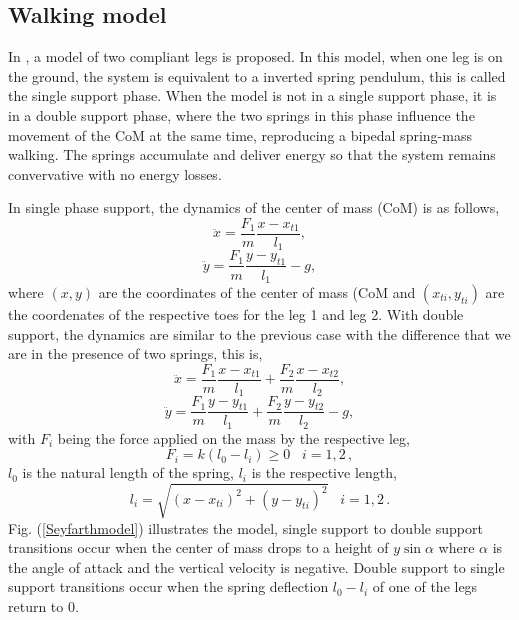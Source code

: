 \subsection{Walking model}\label{walkingmodel}

In \cite{Seyfarth2006}, a model of two compliant legs is proposed. In this model, when one leg is on the ground, the system is equivalent to a inverted spring pendulum, this is called the single support phase. When the model is not in a single support phase, it is in a double support phase, where the two springs in this phase influence the movement of the CoM at the same time, reproducing a bipedal spring-mass walking. The springs accumulate and deliver energy so that the system remains convervative with no energy losses.

\noindent In single phase support, the dynamics of the center of mass (CoM) is as follows,
\begin{equation}
  \ddot{x}=\frac{F_1}{m}\frac{x-x_{t1}}{l_1},
  \label{eq.singlesuppx}
  \end{equation}
\begin{equation}
  \ddot{y}=\frac{F_1}{m}\frac{y-y_{t1}}{l_1}-g,
  \label{eq.singlesuppy}
\end{equation}
 where $(x,y)$ are the coordinates of the center of mass (CoM  and $(x_{ti},y_{ti})$ are the coordenates of the respective toes for the leg 1 and leg 2.
\noindent With double support, the dynamics are similar to the previous case with the difference that we are in the presence of two springs, this is,
\begin{equation}
 \ddot{x}=\frac{F_1}{m}\frac{x-x_{t1}}{l_1}+\frac{F_2}{m}\frac{x-x_{t2}}{l_2},
 \label{eq.doublesuppx}
  \end{equation}
\begin{equation}
  \ddot{y}=\frac{F_1}{m}\frac{y-y_{t1}}{l_1}+\frac{F_2}{m}\frac{y-y_{t2}}{l_2}-g,
  \label{eq.doublesuppy}
\end{equation}
with $F_i$ being the force applied on the mass by the respective leg,
\begin{equation}
  F_i=k(l_0-l_i)\geq 0 \,\,\,\,\, i=1,2\,,
\end{equation}
$l_0$ is the natural length of the spring, $l_i$ is the respective length,
\begin{equation}
l_i=\sqrt{(x-x_{ti})^2+(y-y_{ti})^2} \,\,\,\,\, i =1,2 \,.
\end{equation}
\noindent  Fig. (\ref{Seyfarthmodel}) illustrates the model, single support to double support transitions occur when the center of mass drops to a height of $y \sin{\alpha}$ where $\alpha$ is the angle of attack and the vertical velocity is negative. Double support to single support transitions occur when the spring deflection $l_0 - l_i$ of one of the legs return to 0.

